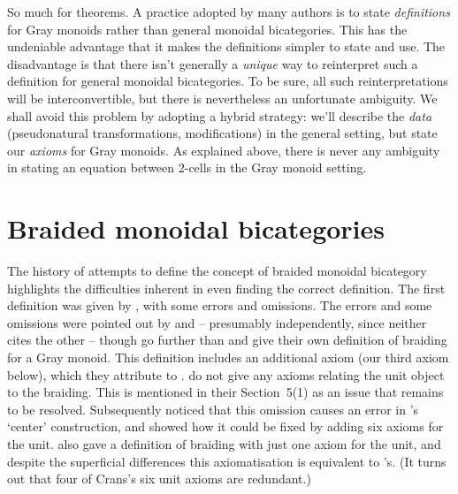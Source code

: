 So much for theorems. A practice adopted by many authors
\citep[e.g.][]{MonBicat,HDA1} is to state \emph{definitions} for
Gray monoids rather than general monoidal bicategories. This has
the undeniable advantage that it makes the definitions simpler
to state and use. The disadvantage is that there isn't generally a \emph{unique}
way to reinterpret such a definition for general monoidal bicategories.
To be sure, all such reinterpretations will be interconvertible, but
there is nevertheless an unfortunate ambiguity. We shall avoid this
problem by adopting a hybrid strategy: we'll describe the \emph{data}
(pseudonatural transformations, modifications) in the general setting,
but state our \emph{axioms} for Gray monoids. As explained above, there is
never any ambiguity in stating an equation between 2-cells in the Gray monoid
setting.

\section{Braided monoidal bicategories}\label{s-braiding}
The history of attempts to define the concept of braided monoidal bicategory highlights
the difficulties inherent in even finding the correct definition. The
first definition was given by \citet{KV}, with some errors and omissions.
The errors and some omissions were pointed out by \citet{CarmodyThesis}
and \citet{HDA1} -- presumably independently, since neither cites the
other -- though \citeauthor{HDA1} go further than \citeauthor{CarmodyThesis}
and give their own definition of braiding for a Gray monoid. This
definition includes an additional axiom (our third axiom below), which they
attribute to \citet{Breen-ator}.
%
 do not give any axioms relating the unit object to the
braiding. This is mentioned in their Section~5(1) as an issue that
remains to be resolved. Subsequently \citet{GeneralizedCenters}
noticed that this omission causes an error in \citeauthor{HDA1}'s
`center' construction, and showed how it could be fixed by adding
six axioms for the unit.  also gave a definition of
braiding with just one axiom for the unit, and despite the superficial
differences this axiomatisation is equivalent to
\citeauthor{GeneralizedCenters}'s. (It turns out that four of Crans's
six unit axioms are redundant.)

